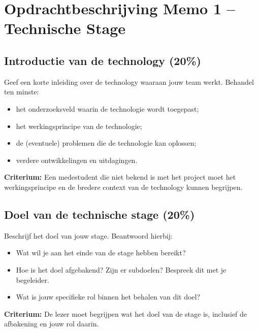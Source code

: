\documentclass[a4paper,11pt]{article}
\begin{document}
\section*{Opdrachtbeschrijving Memo 1 -- Technische Stage}
\subsection*{Introductie van de technology \textbf{(20\%)}}
Geef een korte inleiding over de technology waaraan jouw team werkt. Behandel ten minste:
\begin{itemize}[leftmargin=1.5cm, partopsep=1pt, itemsep=2pt, parsep=0pt]
    \item het onderzoeksveld waarin de technologie wordt toegepast;
    \item het werkingsprincipe van de technologie;
    \item de (eventuele) problemen die de technologie kan oplossen;
    \item verdere ontwikkelingen en uitdagingen.
\end{itemize}

\textbf{Criterium:} Een medestudent die niet bekend is met het project moet het werkingsprincipe en de bredere context van de technology kunnen begrijpen.

\subsection*{Doel van de technische stage \textbf{(20\%)}}
Beschrijf het doel van jouw stage. Beantwoord hierbij:
\begin{itemize}[leftmargin=1.5cm, partopsep=1pt, itemsep=2pt, parsep=0pt]
    \item Wat wil je aan het einde van de stage hebben bereikt?
    \item Hoe is het doel afgebakend? Zijn er subdoelen? Bespreek dit met je begeleider.
    \item Wat is jouw specifieke rol binnen het behalen van dit doel?
\end{itemize}

\textbf{Criterium:} De lezer moet begrijpen wat het doel van de stage is, inclusief de afbakening en jouw rol daarin.
\end{document}
